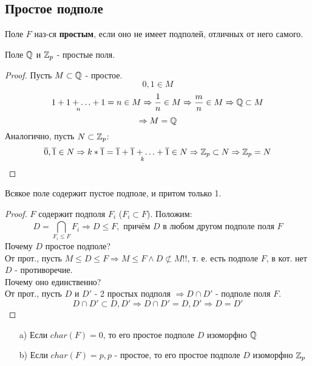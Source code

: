 \subsection{Простое подполе}
\begin{definition}
Поле $F$ наз-ся \textbf{простым}, если оно не имеет подполей, отличных от него самого.
\end{definition}
\begin{example}
Поле $\mathbb{Q}$ и $\mathbb{Z}_p$ - простые поля.
\end{example}
\begin{proof}
  Пусть $M \subset \mathbb{Q}$ - простое.
  \[
    0, 1 \in M
  \]
  \[
  \underset{n}{1 + 1 + \ldots + 1} = n \in M \Rightarrow \frac{1}{n} \in M \Rightarrow \frac{m}{n} \in M \Rightarrow \mathbb{Q} \subset M
  \]
  \[
  \Rightarrow M = \mathbb{Q}
  \]
  Аналогично, пусть $N \subset \mathbb{Z}_p$:
  \[
  \overline{0}, \overline{1} \in N \Rightarrow k * \overline{1} = \underset{k}{\overline{1} + \overline{1} + \ldots + \overline{1}} \in N \Rightarrow \mathbb{Z}_p \subset N \Rightarrow \mathbb{Z}_p = N 
  \]
\end{proof}
\begin{theorem}
Всякое поле содержит пустое подполе, и притом только 1.
\end{theorem}
\begin{proof}
$F$ содержит подполя $F_i$ ($F_i \subset F$). Положим:
\[
D = \bigcap_{F_i \leq F}^{} F_i \Rightarrow D \leq F, \text{ причём $D$ в любом другом подполе поля $F$}
\]
Почему $D$ простое подполе? \\
От прот., пусть $M \leq D \leq F \Rightarrow M \leq F \land D \not\subset M!!$, т. е. есть подполе $F$, в кот. нет $D$ - противоречие. \\
Почему оно единственно? \\
От прот., пусть $D$ и $D'$ - 2 простых подполя $\Rightarrow D \cap D'$ - подполе поля $F$. \\
\[
D \cap D' \subset D, D' \Rightarrow D \cap D' = D, D' \Rightarrow D = D'
\]
\end{proof}
\begin{theorem}
  \begin{itemize}
    \item [a)] Если $char(F) = 0$, то его простое подполе $D$ изоморфно $\mathbb{Q}$
    \item [b) ] Если $char(F) = p, p$ - простое, то его простое подполе $D$ изоморфно $\mathbb{Z}_p$
  \end{itemize}
\end{theorem}
